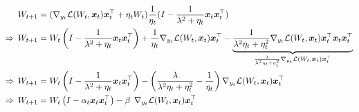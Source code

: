 \begin{align}
    &W_{t+1} = (\nabla_{y_t} \mathcal{L}(W_t,\boldsymbol{x}_t) \boldsymbol{x}_t^{\top} + \eta_t W_t)\frac{1}{\eta_t} (I - \frac{1}{\lambda^2+\eta_t}  \boldsymbol{x}_t \boldsymbol{x}_t^{\top}) \\
    \Rightarrow \:\:& W_{t+1} = W_t \left(I - \frac{1}{\lambda^2+\eta_t}  \boldsymbol{x}_t \boldsymbol{x}_t^{\top} \right) +  \frac{1}{\eta_t} \nabla_{y_t} \mathcal{L}(W_t,\boldsymbol{x}_t) \boldsymbol{x}_t^{\top} - \underset{\frac{\lambda}{\lambda^2\eta_t+\eta^2_t} \nabla_{y_t} \mathcal{L}(W_t,\boldsymbol{x}_t) \boldsymbol{x}_t^{\top}}{\underbrace{\frac{1}{\lambda^2\eta_t+\eta^2_t} \nabla_{y_t} \mathcal{L}(W_t,\boldsymbol{x}_t) \boldsymbol{x}_t^{\top}\boldsymbol{x}_t \boldsymbol{x}_t^{\top}}} \\
    \Rightarrow \:\:&W_{t+1} = W_t \left(I - \frac{1}{\lambda^2+\eta_t}  \boldsymbol{x}_t \boldsymbol{x}_t^{\top} \right)  - \left( \frac{\lambda}{\lambda^2\eta_t+\eta^2_t}  - \frac{1}{\eta_t} \right) \nabla_{y_t} \mathcal{L}(W_t,\boldsymbol{x}_t) \boldsymbol{x}_t^{\top} \\
    \Rightarrow \:\:&W_{t+1} = W_t \left(I - \alpha_t \boldsymbol{x}_t \boldsymbol{x}_t^{\top} \right)  - \beta \:\: \nabla_{y_t} \mathcal{L}(W_t,\boldsymbol{x}_t) \boldsymbol{x}_t^{\top}
\end{align}










